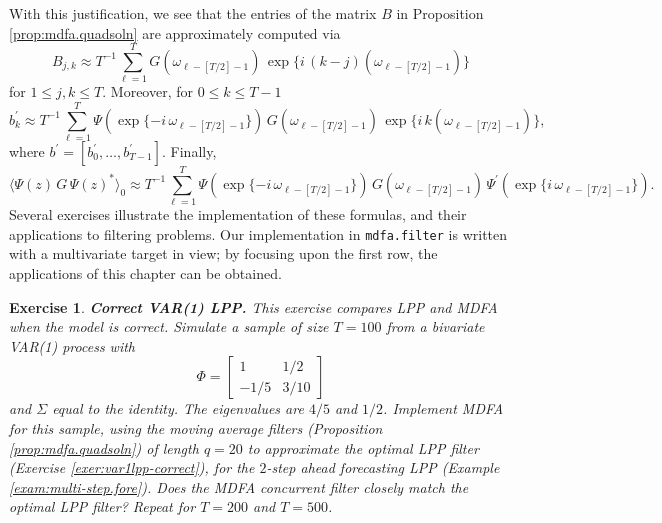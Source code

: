 \documentclass[a4paper]{book}
\newtheorem{Exercise}{Exercise}
\begin{document}
With this justification, we see that the entries of the matrix $B$ in 
 Proposition \ref{prop:mdfa.quadsoln} are approximately computed via
\[
  B_{j,k} \approx T^{-1} \sum_{\ell=1}^T G (\omega_{\ell-[T/2]-1}) \,
   \exp \{ i \, (k-j) (\omega_{\ell-[T/2]-1}) \}
\]
 for $1 \leq j,k \leq T$.  Moreover, for $0 \leq k \leq T-1$
\[
  b_k^{\prime} \approx T^{-1}  \sum_{\ell=1}^T \Psi 
	( \exp\{ -i \,\omega_{\ell-[T/2]-1} \}) \,
     G (\omega_{\ell-[T/2]-1}) \,
   \exp \{ i \, k (\omega_{\ell-[T/2]-1}) \},
\]
 where $b^{\prime} = [ b_0^{\prime}, \ldots, b_{T-1}^{\prime} ]$.  Finally,
\[
  { \langle \Psi (z) \, G \, { \Psi (z) }^* \rangle }_0 \approx
  T^{-1}  \sum_{\ell=1}^T \Psi 
	( \exp\{ -i \,\omega_{\ell-[T/2]-1} \}) \,
     G (\omega_{\ell-[T/2]-1}) \,  \Psi^{\prime} 
	( \exp\{ i \,\omega_{\ell-[T/2]-1} \}).
\]
 Several exercises illustrate the implementation of these formulas,
 and their applications to filtering problems.  Our implementation
 in {\tt mdfa.filter} is written with a multivariate target in view;
 by focusing upon the first row, the applications of this chapter 
 can be obtained. 



\begin{Exercise} {\bf Correct VAR(1) LPP.} \rm
\label{exer:var1lpp-correct.2}
 This exercise compares LPP and MDFA when the model is correct.
 Simulate a sample of size $T=100$ from a
  bivariate VAR(1) process with 
\[
  \Phi = \left[ \begin{array}{cc} 1 & 1/2 \\ -1/5 & 3/10 \end{array} \right]
\]
 and $\Sigma$ equal to the identity.  The eigenvalues are $4/5$ and $1/2$.
  Implement MDFA for this sample, using the moving average filters
 (Proposition \ref{prop:mdfa.quadsoln}) of length $q = 20$ to approximate the optimal
 LPP filter (Exercise \ref{exer:var1lpp-correct}), for the $2$-step
 ahead forecasting LPP (Example \ref{exam:multi-step.fore}). 
  Does the MDFA concurrent filter closely
 match the optimal LPP filter?  Repeat for $T=200$ and $T=500$.
\end{Exercise}
\end{document}
